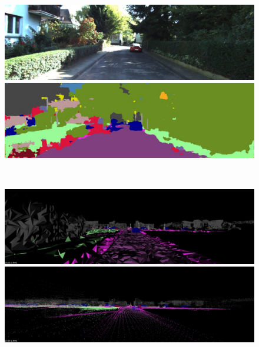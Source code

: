 \begin{figure}[htbp]
 \begin{minipage}[b]{0.50\hsize}
 \begin{center}
  \includegraphics[keepaspectratio, scale=0.18]{./picture/bgrimage/bgrimage9.jpg}
  \end{center}
 \end{minipage}
 \begin{minipage}[b]{0.5\hsize}
 \begin{center}
  \includegraphics[keepaspectratio, scale=0.18]{./picture/segimage/image9.jpg}
  \end{center}
 \end{minipage} \\
 \begin{minipage}[b]{0.50\hsize}
 \begin{center}
  \includegraphics[keepaspectratio, scale=0.18]{./picture/mesh_map_image/image9.jpg}
  \end{center}
 \end{minipage}
 \begin{minipage}[b]{0.50\hsize}
 \begin{center}
  \includegraphics[keepaspectratio, scale=0.18]{./picture/point_map_image/image9.jpg}

\end{center}
\end{minipage}
\end{figure}
